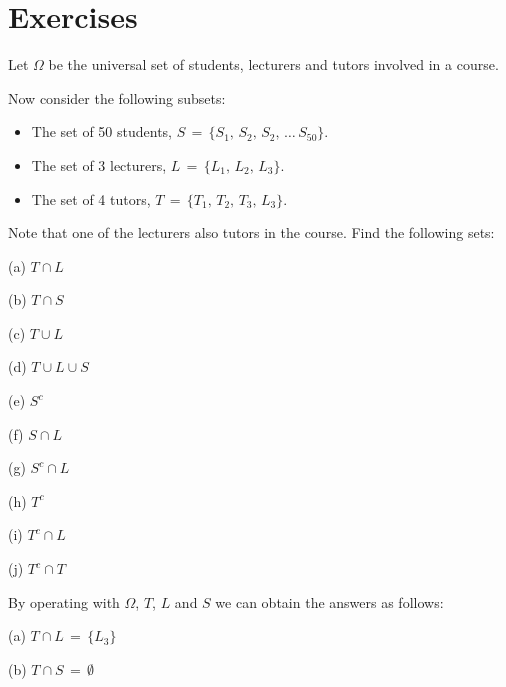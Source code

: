\section{Exercises}\label{xSets}

\begin{ExerciseList}

\Exercise
Let $\Omega$ be the universal set of students, lecturers and tutors involved in a course.

Now consider the following subsets:
\begin{itemize}
\item The set of 50 students, $S\,=\, \{S_1,\, S_2,\, S_2,\,\dots \, S_{50}\}$.

\item The set of 3 lecturers, $L\,=\, \{L_1,\,L_2,\, L_3\}$.

\item The set of 4 tutors, $T\,=\, \{T_1,\,T_2,\, T_3,\, L_3\}$.
\end{itemize}
Note that one of the lecturers also tutors in the course. Find the following sets:

\be

\item[(a)] $T \cap L$

\item[(b)] $T \cap S$

\item[(c)] $T \cup L$

\item[(d)] $T \cup L \cup S$

\item[(e)] $S^c$

\item[(f)] $S \cap L$

\item[(g)] $S^c\cap L$

\item[(h)] $T^c$

\item[(i)] $T^c\cap L$


\item[(j)] $T^c\cap T$

\ee\ecols

\Answer
By operating with $\Omega$, $T$, $L$ and $S$ we can obtain the answers as follows:

{\be

\item[(a)] $T \cap L\,=\, \{L_3\}$

\item[(b)] $T \cap S\,=\, \emptyset$

}
\end{ExerciseList}
